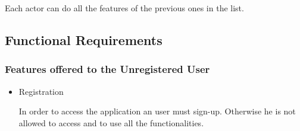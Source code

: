 \documentclass[a4paper]{report}
\begin{document}
\noindent Each actor can do all the features of the previous ones in the list.

\subsection{Functional Requirements}
\subsubsection{Features offered to the Unregistered User}
\begin{itemize}
	\item  Registration
	
	\noindent In order to access the application an user must sign-up. Otherwise he is not allowed to access and to use all the functionalities.
\end{itemize}
\end{document}
